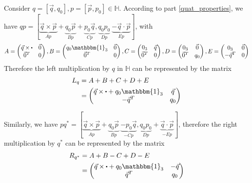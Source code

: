 \documentclass[class=report, float=false, crop=false]{standalone}
\begin{document}
Consider $q = [\vec{q},q_0],p = [\vec{p},p_0] \in \mathbb{H}$. According to part \ref{quat_properties}, we have $qp = [\underbrace{\vec{q}\times\vec{p}}_{Ap} + \underbrace{q_0\vec{p}}_{Bp} + \underbrace{p_0\vec{q}}_{Cp},\underbrace{q_0p_0}_{Dp}~\underbrace{-\vec{q}\cdot\vec{p}}_{Ep}]$, with
\begin{align*}
A = \begin{pmatrix} \vec{q} \times \bigcdot & \vec{0} \\ \vec{0}^T & 0 \end{pmatrix}, B = \begin{pmatrix} q_0 \mathbbm{1}_3 & \vec{0} \\ \vec{0}^T & 0 \end{pmatrix}, C = \begin{pmatrix} 0_3 & \vec{q} \\ \vec{0}^T & 0 \end{pmatrix}, D = \begin{pmatrix} 0_3 & \vec{0} \\ \vec{0}^T & q_0 \end{pmatrix}, E = \begin{pmatrix} 0_3 & \vec{0} \\ -\vec{q}^T & 0 \end{pmatrix}
\end{align*}
Therefore the left multiplication by $q$ in $\mathbb{H}$ can be represented by the matrix
\begin{align*}
L_q &= A + B + C + D + E\\
&= \begin{pmatrix} \vec{q} \times \bigcdot + q_0\mathbbm{1}_3 & \vec{q} \\ -\vec{q}^T & q_0 \end{pmatrix}
\end{align*}

Similarly, we have $pq^* = [\underbrace{\vec{q}\times\vec{p}}_{Ap} + \underbrace{q_0\vec{p}}_{Bp}~\underbrace{-p_0\vec{q}}_{-Cp},\underbrace{q_0p_0}_{Dp} + \underbrace{\vec{q}\cdot\vec{p}}_{-Ep}]$, therefore the right multiplication by $q^*$ can be represented by the matrix
\begin{align*}
R_{q^*} &= A + B - C + D - E\\
&= \begin{pmatrix} \vec{q} \times \bigcdot + q_0\mathbbm{1}_3 & -\vec{q} \\ \vec{q}^T & q_0 \end{pmatrix}
\end{align*}
\end{document}
